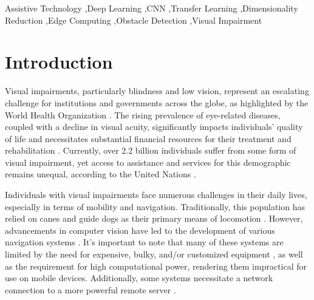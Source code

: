 \documentclass[preprint,12pt]{elsarticle}
\begin{document}
\begin{frontmatter}
\begin{keyword}
	Assistive Technology \sep Deep Learning \sep CNN \sep Transfer Learning \sep Dimensionality Reduction \sep Edge Computing \sep Obstacle Detection \sep Visual Impairment
\end{keyword}




\end{frontmatter}


\section{Introduction}\label{sec:introdution}

Visual impairments, particularly blindness and low vision, represent an escalating challenge for institutions and governments across the globe, as highlighted by the World Health Organization \cite{who2022}. The rising prevalence of eye-related diseases, coupled with a decline in visual acuity, significantly impacts individuals' quality of life and necessitates substantial financial resources for their treatment and rehabilitation \cite{who2022}. Currently, over 2.2 billion individuals suffer from some form of visual impairment, yet access to assistance and services for this demographic remains unequal, according to the United Nations \cite{who2022,bourne2017,onu2019,bourne2020}.

Individuals with visual impairments face numerous challenges in their daily lives, especially in terms of mobility and navigation. Traditionally, this population has relied on canes and guide dogs as their primary means of locomotion \cite{islam2019}. However, advancements in computer vision have led to the development of various navigation systems \cite{islam2019,mandia2023,budrionis2022,kuriakose2021,cardillo2019,bai2019,jiang2019,joe2019,hoang2017,tapu2017,saffoury2016,poggi2016,lakde2015}. It's important to note that many of these systems are limited by the need for expensive, bulky, and/or customized equipment \cite{hoang2017,tapu2017,saffoury2016,poggi2016,poggi2015,rizzo2017}, as well as the requirement for high computational power, rendering them impractical for use on mobile devices. Additionally, some systems necessitate a network connection to a more powerful remote server \cite{jiang2019,lin2017}.
\end{document}
